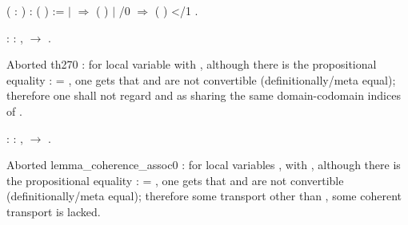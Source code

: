 \coqdocemptyline
\begin{coqdoccode}
\end{coqdoccode}
\vspace{-.15in} \coqdoceol
\coqdocemptyline
\coqdocnoindent
{}  ( : ) :   ( ) :=\coqdoceol
\coqdocindent{1.00em}
  \coqdoceol
\coqdocindent{2.00em}
\ensuremath{|}   \ensuremath{\Rightarrow}  ( )\coqdoceol
\coqdocindent{2.00em}
\ensuremath{|}  /0  \ensuremath{\Rightarrow} ( ) </1 \coqdoceol
\coqdocindent{1.00em}
.

\coqdocemptyline
\begin{coqdoccode}
\coqdocnoindent
{}  : \coqdockw{\ensuremath{\forall}}  : ,   \ensuremath{\rightarrow}   \coqdocnotation{=} .\coqdoceol
\end{coqdoccode}
Aborted th270 : for local variable  with  ,
although there is the propositional equality :   = , one gets 
that   and  are not convertible (definitionally/meta equal);
therefore one shall not regard   and   as sharing
the same domain-codomain indices of . \begin{coqdoccode}
\coqdocemptyline
\coqdocnoindent
{}  : \coqdockw{\ensuremath{\forall}}   : ,    \ensuremath{\rightarrow}   \coqdocnotation{=}  .\coqdoceol
\end{coqdoccode}
Aborted lemma\_coherence\_assoc0 : for local variables ,  with   ,
although there is the propositional equality  :   =  ,
one gets that   and   are not convertible (definitionally/meta equal);
therefore some transport other than , some coherent transport is lacked. 

